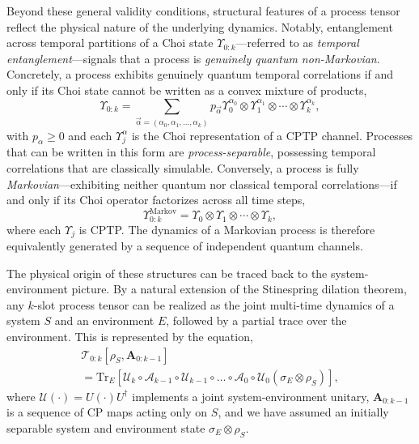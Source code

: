 \documentclass[
    aps,
    prx,
    reprint,
    superscriptaddress,
    longbibliography,
    nofootinbib,
    floatfix,
]{revtex4-2}
\newcommand{\Tr}{\mathrm{Tr}}
\begin{document}

Beyond these general validity conditions, structural features of a process tensor reflect the physical nature of the underlying dynamics. Notably, entanglement across temporal partitions of a Choi state \(\Upsilon_{0:k}\)---referred to as \emph{temporal entanglement}---signals that a process is \emph{genuinely quantum non-Markovian}. Concretely, a process exhibits genuinely quantum temporal correlations if and only if its Choi state cannot be written as a convex mixture of products, 
\begin{equation}\label{eq:process-separable}
\Upsilon_{0:k} = \sum_{\vec{\alpha} = (\alpha_0, \alpha_1, \dots, \alpha_k)} p_{\vec{\alpha}} \Upsilon_0^{\alpha_0} \otimes \Upsilon_1^{\alpha_1} \otimes \cdots \otimes \Upsilon_k^{\alpha_k},
\end{equation}
with \(p_\alpha \geq 0\) and each \(\Upsilon_j^\alpha\) is the Choi representation of a CPTP channel. Processes that can be written in this form are \emph{process-separable}, possessing temporal correlations that are classically simulable. Conversely, a process is fully \emph{Markovian}---exhibiting neither quantum nor classical temporal correlations---if and only if its Choi operator factorizes across all time steps,
\begin{equation}\label{eq:markovian-process}
    \Upsilon_{0:k}^{\textrm{Markov}} = \Upsilon_0 \otimes \Upsilon_1 \otimes \cdots \otimes \Upsilon_k,
\end{equation}
where each \(\Upsilon_j\) is CPTP. The dynamics of a Markovian process is therefore equivalently generated by a sequence of independent quantum channels.

The physical origin of these structures can be traced back to the system-environment picture. By a natural extension of the Stinespring dilation theorem, any \(k\)-slot process tensor can be realized as the joint multi-time dynamics of a system \(S\) and an environment \(E\), followed by a partial trace over the environment. This is represented by the equation,
\begin{multline}
    \mathcal{T}_{0:k}[\rho_S, \mathbf{A}_{0:k-1}] \\ 
    = \Tr_E\left[\mathcal{U}_k \circ \mathcal{A}_{k-1} \circ \mathcal{U}_{k-1} \circ \dots \circ \mathcal{A}_0 \circ \mathcal{U}_0(\sigma_E\otimes\rho_S) \right],
\end{multline}
where \(\mathcal{U}(\cdot) = U(\cdot)U^\dagger\) implements a joint system-environment unitary, \(\mathbf{A}_{0:k-1}\) is a sequence of CP maps acting only on \(S\), and we have assumed an initially separable system and environment state \(\sigma_E \otimes \rho_S\).
\end{document}
